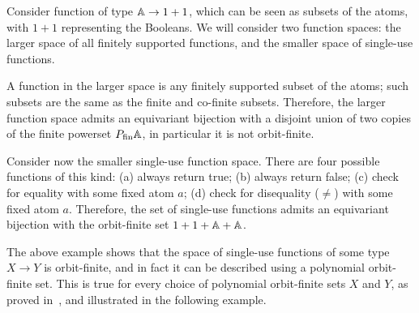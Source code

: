 \begin{example}\label{ex:first-single-use-function-space}
    Consider function of type $\mathbb A \to 1 + 1$, which can be seen as subsets of the atoms, with $1+1$ representing the Booleans. We will consider two function spaces: the larger space of all finitely supported functions, and the smaller space of single-use functions.
    
    A function in the larger space is any finitely supported subset of the atoms; such subsets are the same as the finite and co-finite subsets. Therefore, the larger function space admits an equivariant bijection with a disjoint union of two copies of the finite powerset $\powerset_{\text{fin}} \atoms$, in particular it is not orbit-finite.
    
    Consider now the smaller single-use function space. There are four possible functions of this kind: (a) always return true; (b) always return false; (c) check for equality with some fixed atom $a$; (d) check for disequality ($\neq$) with some fixed atom $a$.  Therefore,  the set of single-use functions  admits an equivariant bijection with the orbit-finite set $1 + 1 + \mathbb A + \mathbb A$.
    \exampleend
\end{example}


The above example shows that the space of single-use functions of some type $X \to Y$ is orbit-finite, and in fact it can be described using a polynomial orbit-finite set. This is true for every choice of polynomial orbit-finite sets $X$ and $Y$, as proved in~\cite[Theorem 5]{stefanski-phd}, and illustrated in the following example. 

